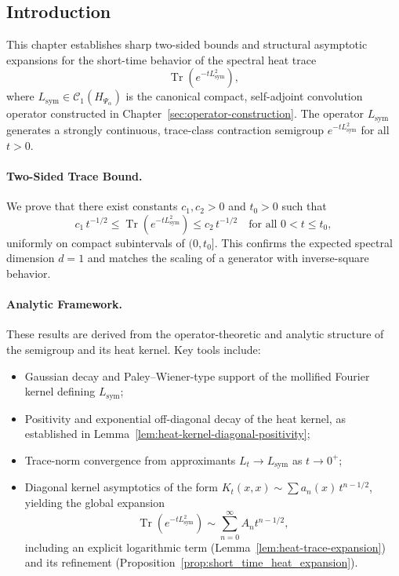 \subsection*{Introduction}

This chapter establishes sharp two-sided bounds and structural asymptotic expansions for the short-time behavior of the spectral heat trace
\[
\operatorname{Tr}(e^{-t L_{\mathrm{sym}}^2}),
\]
where \( L_{\mathrm{sym}} \in \mathcal{C}_1(H_{\Psi_\alpha}) \) is the canonical compact, self-adjoint convolution operator constructed in Chapter~\ref{sec:operator-construction}. The operator \( L_{\mathrm{sym}} \) generates a strongly continuous, trace-class contraction semigroup \( e^{-tL_{\mathrm{sym}}^2} \) for all \( t > 0 \).

\paragraph{Two-Sided Trace Bound.}
We prove that there exist constants \( c_1, c_2 > 0 \) and \( t_0 > 0 \) such that
\[
c_1\, t^{-1/2} \le \operatorname{Tr}(e^{-t L_{\mathrm{sym}}^2}) \le c_2\, t^{-1/2}
\quad \text{for all } 0 < t \le t_0,
\]
uniformly on compact subintervals of \( (0, t_0] \). This confirms the expected spectral dimension \( d = 1 \) and matches the scaling of a generator with inverse-square behavior.

\paragraph{Analytic Framework.}
These results are derived from the operator-theoretic and analytic structure of the semigroup and its heat kernel. Key tools include:
\begin{itemize}
  \item Gaussian decay and Paley--Wiener-type support of the mollified Fourier kernel defining \( L_{\mathrm{sym}} \);
  \item Positivity and exponential off-diagonal decay of the heat kernel, as established in Lemma~\ref{lem:heat-kernel-diagonal-positivity};
  \item Trace-norm convergence from approximants \( L_t \to L_{\mathrm{sym}} \) as \( t \to 0^+ \);
  \item Diagonal kernel asymptotics of the form \( K_t(x,x) \sim \sum a_n(x)\, t^{n - 1/2} \), yielding the global expansion
  \[
  \operatorname{Tr}(e^{-t L_{\mathrm{sym}}^2}) \sim \sum_{n=0}^\infty A_n t^{n - 1/2},
  \]
  including an explicit logarithmic term (Lemma~\ref{lem:heat-trace-expansion}) and its refinement (Proposition~\ref{prop:short_time_heat_expansion}).
\end{itemize}

